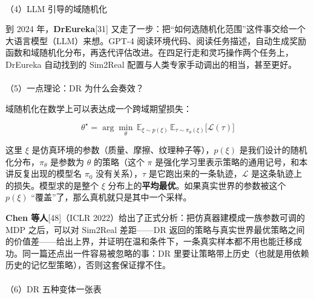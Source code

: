 \documentclass[
  chinese,
]{ctexart}
\makeatletter
\let\oldparagraph\paragraph
\renewcommand{\paragraph}{
    \@ifstar
      \xxxParagraphStar
      \xxxParagraphNoStar
  }
\newcommand{\xxxParagraphStar}[1]{\oldparagraph*{#1}\mbox{}}
\newcommand{\xxxParagraphNoStar}[1]{\oldparagraph{#1}\mbox{}}
\makeatother
\begin{document}
\paragraph{（4）LLM
引导的域随机化}\label{llm-ux5f15ux5bfcux7684ux57dfux968fux673aux5316}

到 2024 年，\textbf{DrEureka}{[}31{]}
又走了一步：把``如何选随机化范围''这件事交给一个大语言模型（LLM）来想。GPT-4
阅读环境代码、阅读任务描述，自动生成奖励函数和域随机化分布，再迭代评估改进。在四足行走和灵巧操作两个任务上，DrEureka
自动找到的 Sim2Real 配置与人类专家手动调出的相当，甚至更好。

\paragraph{（5）一点理论：DR
为什么会奏效？}\label{ux4e00ux70b9ux7406ux8bbadr-ux4e3aux4ec0ux4e48ux4f1aux594fux6548}

域随机化在数学上可以表达成一个跨域期望损失：

\[
\theta^{\star} = \arg\min_{\theta} \, \mathbb{E}_{\xi \sim p(\xi)} \, \mathbb{E}_{\tau \sim \pi_\theta(\xi)} \big[\mathcal{L}(\tau)\big]
\]

这里 \(\xi\) 是仿真环境的参数（质量、摩擦、纹理种子等），\(p(\xi)\)
是我们设计的随机化分布，\(\pi_\theta\) 是参数为 \(\theta\) 的策略（这个
\(\pi\) 是强化学习里表示策略的通用记号，和本讲反复出现的模型名 \(\pi_0\)
没有关系），\(\tau\) 是它跑出来的一条轨迹，\(\mathcal{L}\)
是这条轨迹上的损失。模型求的是整个 \(\xi\)
分布上的\textbf{平均最优}。如果真实世界的参数被这个 \(p(\xi)\)
``覆盖''了，那么真机就只是其中一个采样。

\textbf{Chen 等人}{[}48{]}（ICLR
2022）给出了正式分析：把仿真器建模成一族参数可调的 MDP 之后，可以对
Sim2Real 差距------DR
返回的策略与真实世界最优策略之间的价值差------给出上界，并证明在温和条件下，一条真实样本都不用也能迁移成功。同一篇还点出一件容易被忽略的事：DR
里要让策略带上历史（也就是用依赖历史的记忆型策略），否则这套保证撑不住。

\paragraph{（6）DR
五种变体一张表}\label{dr-ux4e94ux79cdux53d8ux4f53ux4e00ux5f20ux8868}
\end{document}

